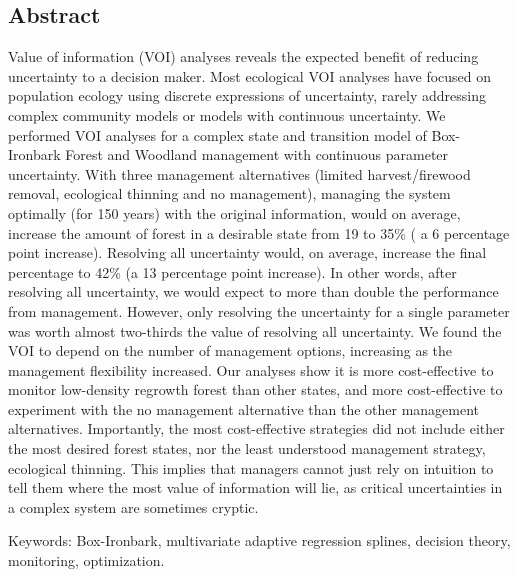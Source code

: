 
\subsection*{Abstract}\label{abstract}

Value of information (VOI) analyses reveals the expected benefit of reducing uncertainty to a decision maker. Most ecological VOI analyses have focused on population ecology using discrete expressions of uncertainty, rarely addressing complex community models or models with continuous uncertainty. We performed VOI analyses for a complex state and transition model of Box-Ironbark Forest and Woodland management with continuous parameter uncertainty. With three management alternatives (limited harvest/firewood removal, ecological thinning and no management), managing the system optimally (for 150 years) with the original information, would on average, increase the amount of forest in a desirable state from 19 to 35\% ( a 6 percentage point increase). Resolving all uncertainty would, on average, increase the final percentage to 42\% (a 13 percentage point increase). In other words, after resolving all uncertainty, we would expect to more than double the performance from management. However, only resolving the uncertainty for a single parameter was worth almost two-thirds the value of resolving all uncertainty. We found the VOI to depend on the number of management options, increasing as the management flexibility increased. Our analyses show it is more cost-effective to monitor low-density regrowth forest than other states, and more cost-effective to experiment with the no management alternative than the other management alternatives. Importantly, the most cost-effective strategies did not include either the most desired forest states, nor the least understood management strategy, ecological thinning. This implies that managers cannot just rely on intuition to tell them where the most value of information will lie, as critical uncertainties in a complex system are sometimes cryptic.

Keywords: Box-Ironbark, multivariate adaptive regression splines, decision theory, monitoring, optimization.